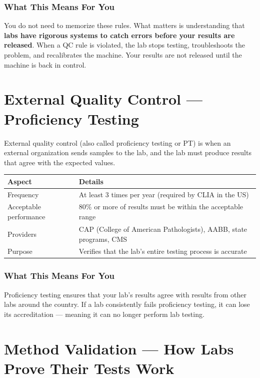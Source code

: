 \subsubsection{What This Means For You}

You do not need to memorize these rules. What matters is understanding that \textbf{labs have rigorous systems to catch errors before your results are released}. When a QC rule is violated, the lab stops testing, troubleshoots the problem, and recalibrates the machine. Your results are not released until the machine is back in control.

\clearpage
\section{External Quality Control --- Proficiency Testing}

External quality control (also called proficiency testing or PT) is when an external organization sends samples to the lab, and the lab must produce results that agree with the expected values.

\begin{longtable}{@{}p{4.5cm}p{10.5cm}@{}}
\toprule
\textbf{Aspect} & \textbf{Details} \\
\midrule
Frequency & At least 3 times per year (required by CLIA in the US) \\
Acceptable performance & 80\% or more of results must be within the acceptable range \\
Providers & CAP (College of American Pathologists), AABB, state programs, CMS \\
Purpose & Verifies that the lab's entire testing process is accurate \\
\bottomrule
\end{longtable}

\subsubsection{What This Means For You}

Proficiency testing ensures that your lab's results agree with results from other labs around the country. If a lab consistently fails proficiency testing, it can lose its accreditation --- meaning it can no longer perform lab testing.

\clearpage
\section{Method Validation --- How Labs Prove Their Tests Work}

